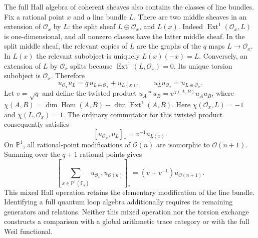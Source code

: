 The full Hall algebra of coherent sheaves also contains the classes of
line bundles. Fix a rational point $x$ and a line bundle $L$.
There are two middle sheaves in an extension of $\mathcal O_x$ by $L$:
the split sheaf $L\oplus\mathcal O_x$, and $L(x)$.
Indeed $\operatorname{Ext}^1(\mathcal O_x,L)$ is one-dimensional,
and all nonzero classes have the latter middle sheaf.
In the split middle sheaf, the relevant copies of $L$ are the graphs of
the $q$ maps $L\to\mathcal O_x$. In $L(x)$ the relevant subobject is
uniquely $L(x)(-x)=L$. Conversely, an extension of $L$ by $\mathcal O_x$
splits because $\operatorname{Ext}^1(L,\mathcal O_x)=0$.
Its unique torsion subobject is $\mathcal O_x$. Therefore
\[
 u_{\mathcal O_x}u_L=q\,u_{L\oplus\mathcal O_x}+u_{L(x)},\qquad
 u_Lu_{\mathcal O_x}=u_{L\oplus\mathcal O_x}.
\]
Let $v=\sqrt q$ and define the twisted product
$u_A*u_B=v^{\chi(A,B)}u_Au_B$, where
$\chi(A,B)=\dim\operatorname{Hom}(A,B)-\dim\operatorname{Ext}^1(A,B)$.
Here $\chi(\mathcal O_x,L)=-1$ and $\chi(L,\mathcal O_x)=1$.
The ordinary commutator for this twisted product consequently satisfies
\[
 [u_{\mathcal O_x},u_L]_* =v^{-1}u_{L(x)}.
\]
On $\mathbb P^1$, all rational-point modifications of $\mathcal O(n)$
are isomorphic to $\mathcal O(n+1)$. Summing over the $q+1$ rational points gives
\[
 \left[\sum_{x\in\mathbb P^1(\mathbb F_q)}u_{\mathcal O_x},
 u_{\mathcal O(n)}\right]_*
 =(v+v^{-1})u_{\mathcal O(n+1)}.
\]
This mixed Hall operation retains the elementary modification of the line
bundle. Identifying a full quantum loop algebra additionally requires
its remaining generators and relations. Neither this mixed operation nor
the torsion exchange constructs a comparison with a global arithmetic
trace category or with the full Weil functional.
